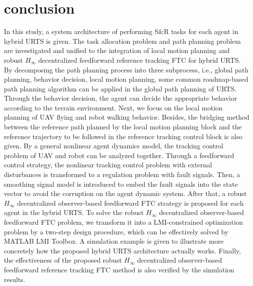 \documentclass{ieeeaccess}
\begin{document}
\section{conclusion}
In this study, a system architecture of performing S\&R tasks for each agent in hybrid URTS is given. The task allocation problem and path planning problem are investigated and unified to the integration of local motion planning and robust $H_\infty$ decentralized feedforward reference tracking FTC for hybrid URTS. By decomposing the path planning process into three subprocess, i.e., global path planning, behavior decision, local motion planning, some common roadmap-based path planning algorithm can be applied in the global path planning of URTS. Through the behavior decision, the agent can decide the appropriate behavior according to the terrain environment. Next, we focus on the local motion planning of UAV flying and robot walking behavior. Besides, the bridging method between the reference path planned by the local motion planning block and the reference trajectory to be followed in the reference tracking control block is also given. By a general nonlinear agent dynamics model, the tracking control problem of UAV and robot can be analyzed together. Through a feedforward control strategy, the nonlinear tracking control problem with external disturbances is transformed to a regulation problem with fault signals. Then, a smoothing signal model is introduced to embed the fault signals into the state vector to avoid the corruption on the agent dynamic system. After that, a robust $H_\infty$ decentralized observer-based feedforward FTC strategy is proposed for each agent in the hybrid URTS. To solve the robust $H_\infty$ decentralized observer-based feedforward FTC problem, we transform it into a LMI-constrained optimization problem by a two-step design procedure, which can be effectively solved by MATLAB LMI Toolbox. A simulation example is given to illustrate more concretely how the proposed hybrid URTS architecture actually works. Finally, the effectiveness of the proposed robust $H_\infty$ decentralized observer-based feedforward reference tracking FTC method is also verified by the simulation results.



\end{document}

